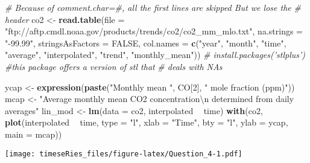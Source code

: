 \documentclass[]{book}
\newenvironment{Shaded}{\begin{snugshade}}{\end{snugshade}}
\newcommand{\CharTok}[1]{\textcolor[rgb]{0.31,0.60,0.02}{#1}}
\newcommand{\CommentTok}[1]{\textcolor[rgb]{0.56,0.35,0.01}{\textit{#1}}}
\newcommand{\DataTypeTok}[1]{\textcolor[rgb]{0.13,0.29,0.53}{#1}}
\newcommand{\DecValTok}[1]{\textcolor[rgb]{0.00,0.00,0.81}{#1}}
\newcommand{\KeywordTok}[1]{\textcolor[rgb]{0.13,0.29,0.53}{\textbf{#1}}}
\newcommand{\NormalTok}[1]{#1}
\newcommand{\OperatorTok}[1]{\textcolor[rgb]{0.81,0.36,0.00}{\textbf{#1}}}
\newcommand{\OtherTok}[1]{\textcolor[rgb]{0.56,0.35,0.01}{#1}}
\newcommand{\StringTok}[1]{\textcolor[rgb]{0.31,0.60,0.02}{#1}}
\begin{document}
\begin{Shaded}
\begin{Highlighting}[]
\CommentTok{# Because of comment.char=#, all the first lines are skipped But we lose the}
\CommentTok{# header}
\NormalTok{co2 <-}\StringTok{ }\KeywordTok{read.table}\NormalTok{(}\DataTypeTok{file =} \StringTok{"ftp://aftp.cmdl.noaa.gov/products/trends/co2/co2_mm_mlo.txt"}\NormalTok{, }
    \DataTypeTok{na.strings =} \StringTok{"-99.99"}\NormalTok{, }\DataTypeTok{stringsAsFactors =} \OtherTok{FALSE}\NormalTok{, }\DataTypeTok{col.names =} \KeywordTok{c}\NormalTok{(}\StringTok{"year"}\NormalTok{, }\StringTok{"month"}\NormalTok{, }
        \StringTok{"time"}\NormalTok{, }\StringTok{"average"}\NormalTok{, }\StringTok{"interpolated"}\NormalTok{, }\StringTok{"trend"}\NormalTok{, }\StringTok{"monthly_mean"}\NormalTok{))}
\CommentTok{# install.packages('stlplus') #this package offers a version of stl that}
\CommentTok{# deals with NAs}

\NormalTok{ycap <-}\StringTok{ }\KeywordTok{expression}\NormalTok{(}\KeywordTok{paste}\NormalTok{(}\StringTok{"Monthly mean "}\NormalTok{, CO[}\DecValTok{2}\NormalTok{], }\StringTok{" mole fraction (ppm)"}\NormalTok{))}
\NormalTok{mcap <-}\StringTok{ "Average monthly mean CO2 concentration}\CharTok{\textbackslash{}n}\StringTok{ determined from daily averages"}
\NormalTok{lin_mod <-}\StringTok{ }\KeywordTok{lm}\NormalTok{(}\DataTypeTok{data =}\NormalTok{ co2, interpolated }\OperatorTok{~}\StringTok{ }\NormalTok{time)}
\KeywordTok{with}\NormalTok{(co2, }\KeywordTok{plot}\NormalTok{(interpolated }\OperatorTok{~}\StringTok{ }\NormalTok{time, }\DataTypeTok{type =} \StringTok{"l"}\NormalTok{, }\DataTypeTok{xlab =} \StringTok{"Time"}\NormalTok{, }\DataTypeTok{bty =} \StringTok{"l"}\NormalTok{, }\DataTypeTok{ylab =}\NormalTok{ ycap, }
    \DataTypeTok{main =}\NormalTok{ mcap))}
\end{Highlighting}
\end{Shaded}

\texttt{[image: timeseRies\_files/figure-latex/Question\_4-1.pdf]}

\begin{Shaded}
\end{Shaded}
\end{document}
